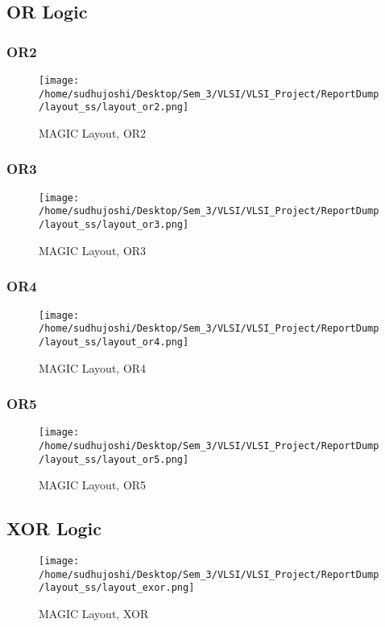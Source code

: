 \documentclass[conference]{IEEEtran}
\begin{document}
\subsection{OR Logic}
\subsubsection{OR2}
\begin{figure}[H] 
    \centering
    \texttt{[image: /home/sudhujoshi/Desktop/Sem\_3/VLSI/VLSI\_Project/ReportDump/layout\_ss/layout\_or2.png]}
    \caption{MAGIC Layout, OR2} 
\end{figure}
\subsubsection{OR3}
\begin{figure}[H] 
    \centering
    \texttt{[image: /home/sudhujoshi/Desktop/Sem\_3/VLSI/VLSI\_Project/ReportDump/layout\_ss/layout\_or3.png]}
    \caption{MAGIC Layout, OR3} 
\end{figure}
\subsubsection{OR4}
\begin{figure}[H] 
    \centering
    \texttt{[image: /home/sudhujoshi/Desktop/Sem\_3/VLSI/VLSI\_Project/ReportDump/layout\_ss/layout\_or4.png]}
    \caption{MAGIC Layout, OR4} 
\end{figure}
\subsubsection{OR5}
\begin{figure}[H] 
    \centering
    \texttt{[image: /home/sudhujoshi/Desktop/Sem\_3/VLSI/VLSI\_Project/ReportDump/layout\_ss/layout\_or5.png]}
    \caption{MAGIC Layout, OR5} 
\end{figure}


\subsection{XOR Logic}
\begin{figure}[H] 
    \centering
    \texttt{[image: /home/sudhujoshi/Desktop/Sem\_3/VLSI/VLSI\_Project/ReportDump/layout\_ss/layout\_exor.png]}
    \caption{MAGIC Layout, XOR} 
\end{figure}
\end{document}
